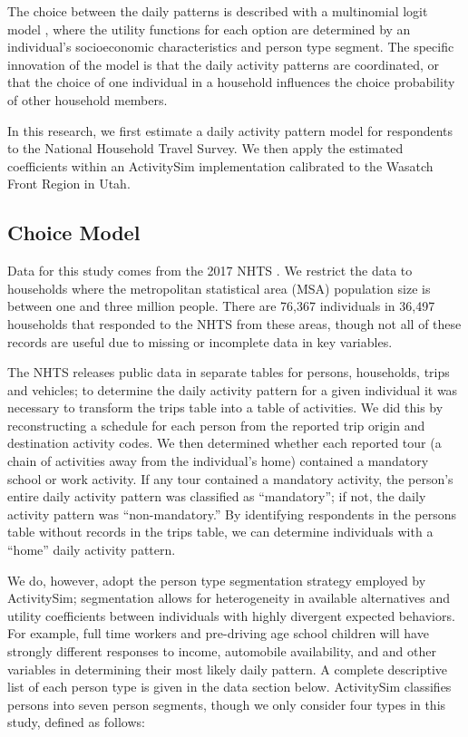 \documentclass[3p, authoryear, review]{elsarticle} %
\begin{document}
The choice between the daily patterns is described with a multinomial logit
model \citep{Domencich1975}, where the utility functions for each option are
determined by an individual's socioeconomic characteristics and person type
segment. The specific innovation of the \citet{Bradley2005} model is that the daily
activity patterns are coordinated, or that the choice of one individual in a
household influences the choice probability of other household members.

In this research, we first estimate a daily activity pattern model for
respondents to the National Household Travel Survey. We then apply the estimated
coefficients within an ActivitySim implementation calibrated to the Wasatch Front
Region in Utah.

\hypertarget{choice-model}{%
\subsection{Choice Model}\label{choice-model}}

Data for this study comes from the 2017 NHTS \citep{fhwa2017}. We restrict the
data to households where the metropolitan statistical area (MSA) population size
is between one and three million people. There are 76,367 individuals in 36,497
households that responded to the NHTS from these areas, though not all of these
records are useful due to missing or incomplete data in key variables.

The NHTS releases public data in separate tables for persons, households,
trips and vehicles; to determine the daily activity pattern for a given
individual it was necessary to transform the trips table into a table of
activities. We did this by reconstructing a schedule for each person from the
reported trip origin and destination activity codes. We then determined whether
each reported tour (a chain of activities away from the individual's home)
contained a mandatory school or work activity. If any tour contained a mandatory
activity, the person's entire daily activity pattern was classified as ``mandatory'';
if not, the daily activity pattern was ``non-mandatory.'' By identifying respondents
in the persons table without records in the trips table, we can determine
individuals with a ``home'' daily activity pattern.

We do, however, adopt the person type segmentation strategy employed by
ActivitySim; segmentation allows for heterogeneity in available
alternatives and utility coefficients between individuals with highly divergent
expected behaviors. For example, full time workers and pre-driving age school children
will have strongly different responses to income, automobile availability, and
and other variables in determining their most likely daily pattern.
A complete descriptive list of each person type is given in the data
section below.
ActivitySim classifies persons into seven person segments, though we only
consider four types in this study, defined as follows:
\end{document}
